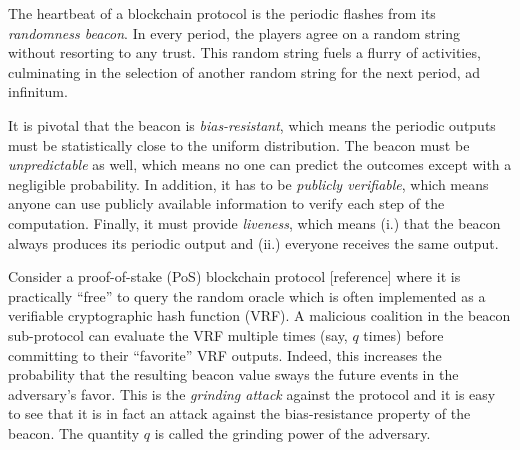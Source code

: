 
The heartbeat of a blockchain protocol is the periodic flashes from its \emph{randomness beacon}. 
In every period, the players agree on a random string without resorting to any trust. 
This random string fuels a flurry of activities, 
culminating in the selection of another random string for the next period, ad infinitum. 

It is pivotal that the beacon is \emph{bias-resistant}, 
which means the periodic outputs must be statistically close to the uniform distribution. 
The beacon must be \emph{unpredictable} as well, which means no one can predict the outcomes except with a negligible probability. 
In addition, it has to be \emph{publicly verifiable}, 
which means anyone can use publicly available information to verify each step of the computation. 
Finally, it must provide \emph{liveness}, which means (i.) that the beacon always produces its periodic output 
and (ii.) everyone receives the same output. 

Consider a proof-of-stake (PoS) blockchain protocol [reference] 
where it is practically ``free'' to query the random oracle 
which is often implemented as a verifiable cryptographic hash function (VRF).
A malicious coalition in the beacon sub-protocol can evaluate the VRF multiple times (say, $q$ times) 
before committing to their ``favorite'' VRF outputs. 
Indeed, this increases the probability that the resulting beacon value sways the future events in the adversary's favor. 
This is the \emph{grinding attack} against the protocol and it is easy to see that 
it is in fact an attack against the bias-resistance property of the beacon. 
The quantity $q$ is called the grinding power of the adversary.

